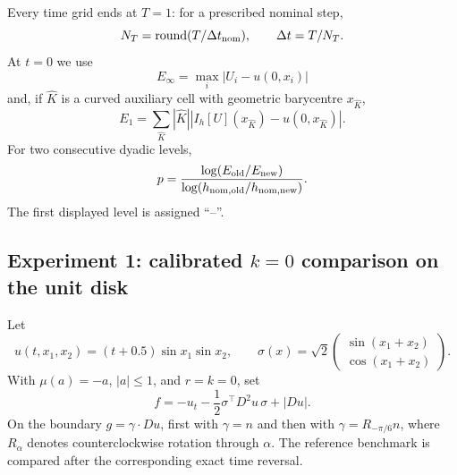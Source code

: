 \documentclass[11pt]{article}
\theoremstyle{definition}
\theoremstyle{remark}
\begin{document}
Every time grid ends at $T=1$: for a prescribed nominal step,
\begin{equation}
 N_T=\operatorname{round}(T/\Delta t_{\rm nom}),
 \qquad \Delta t=T/N_T.
 \label{eq:numerical-time-alignment}
\end{equation}
At $t=0$ we use
\[
 E_\infty=\max_i|U_i-u(0,x_i)|
\]
and, if $\widehat K$ is a curved auxiliary cell with geometric barycentre
$x_{\widehat K}$,
\begin{equation}
 E_1=\sum_{\widehat K}|\widehat K|
 \left|I_h[U](x_{\widehat K})-u(0,x_{\widehat K})\right|.
 \label{eq:barycentric-E1}
\end{equation}
For two consecutive dyadic levels,
\[
 p=\frac{\log(E_{\rm old}/E_{\rm new})}
          {\log(h_{{\rm nom,old}}/h_{{\rm nom,new}})}.
\]
The first displayed level is assigned ``--''.

\subsection{Experiment 1: calibrated \texorpdfstring{$k=0$}{k=0}
comparison on the unit disk}
\label{sec:disk-comparison}

Let
\[
 u(t,x_1,x_2)=(t+0.5)\sin x_1\sin x_2,\qquad
 \sigma(x)=\sqrt2
 \begin{pmatrix}\sin(x_1+x_2)\\ \cos(x_1+x_2)\end{pmatrix}.
\]
With $\mu(a)=-a$, $|a|\le1$, and $r=k=0$, set
\begin{equation}
 f=-u_t-\frac12\sigma^\top D^2u\,\sigma+|Du|.
 \label{eq:experiment2-source}
\end{equation}
On the boundary $g=\gamma\cdot Du$, first with $\gamma=n$ and then with
$\gamma=R_{-\pi/6}n$, where $R_\alpha$ denotes counterclockwise rotation
through $\alpha$.  The reference benchmark is compared after the
corresponding exact time reversal.
\end{document}
